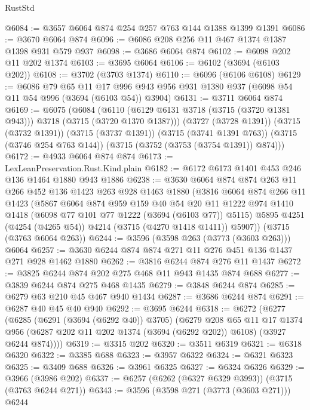 \begin{lexlean}{RustStd}
\begin{coremodule}
@6084 := @3657 @6064 @874 @254 @257 @763 @144 @1388 @1399 @1391
@6086 := @3670 @6064 @874
@6096 := @6086 @208 @256 @11 @467 @1374 @1387 @1398 @931 @579 @937
@6098 := @3686 @6064 @874
@6102 := @6098 @202 @11 @202 @1374
@6103 := @3695 @6064
@6106 := @6102 (@3694 (@6103 @202))
@6108 := @3702 (@3703 @1374)
@6110 := @6096 (@6106 @6108)
@6129 := @6086
    @79
    @65
    @11
    @17
    @996
    @943
    @956
    @931
    @1380
    @937
    (@6098 @54 @11 @54 @996 (@3694 (@6103 @54)) @3904)
@6131 := @3711 @6064 @874
@6169 := @6075
    (@6084
      (@6110 (@6129 @6131 @3718 (@3715 (@3720 @1381 @943))) @3718 (@3715 (@3720 @1370 @1387)))
      (@3727 (@3728 @1391))
      (@3715 (@3732 @1391))
      (@3715 (@3737 @1391))
      (@3715 (@3741 @1391 @763))
      (@3715 (@3746 @254 @763 @144))
      (@3715 (@3752 (@3753 (@3754 @1391)) @874)))
@6172 := @4933 @6064 @874 @874
@6173 := LexLeanPreservation.Rust.Kind.plain
@6182 := @6172 @6173 @1401 @453 @246 @136 @1464 @1880 @943 @1886
@6238 := @3630
    @6064
    @874
    @874
    @263
    @11
    @266
    @452
    @136
    @1423
    @263
    @928
    @1463
    @1880
    (@3816
      @6064
      @874
      @266
      @11
      @1423
      (@5867
        @6064
        @874
        @959
        @159
        @40
        @54
        @20
        @11
        @1222
        @974
        @1410
        @1418
        (@6098 @77 @101 @77 @1222 (@3694 (@6103 @77)) @5115)
        @5895
        @4251
        (@4254 (@4265 @54))
        @4214
        (@3715 (@4270 @1418 @1411))
        @5907))
    (@3715 (@3763 @6064 @263))
@6244 := @3596 (@3598 @263 (@3773 (@3603 @263))) @6064
@6257 := @3630 @6244 @874 @874 @271 @11 @276 @451 @136 @1437 @271 @928 @1462 @1880
@6262 := @3816 @6244 @874 @276 @11 @1437
@6272 := @3825 @6244 @874 @202 @275 @468 @11 @943 @1435 @874 @688
@6277 := @3839 @6244 @874 @275 @468 @1435
@6279 := @3848 @6244 @874
@6285 := @6279 @63 @210 @45 @467 @940 @1434
@6287 := @3686 @6244 @874
@6291 := @6287 @40 @45 @40 @940
@6292 := @3695 @6244
@6318 := @6272
    (@6277
      (@6285
        (@6291 (@3694 (@6292 @40)) @3705)
        (@6279
          @208
          @65
          @11
          @17
          @1374
          @956
          (@6287 @202 @11 @202 @1374 (@3694 (@6292 @202)) @6108)
          (@3927 @6244 @874))))
@6319 := @3315 @202
@6320 := @3511 @6319
@6321 := @6318 @6320
@6322 := @3385 @688
@6323 := @3957 @6322
@6324 := @6321 @6323
@6325 := @3409 @688
@6326 := @3961 @6325
@6327 := @6324 @6326
@6329 := @3966 (@3986 @202)
@6337 := @6257 (@6262 (@6327 @6329 @3993)) (@3715 (@3763 @6244 @271))
@6343 := @3596 (@3598 @271 (@3773 (@3603 @271))) @6244

\end{coremodule}
\end{lexlean}
